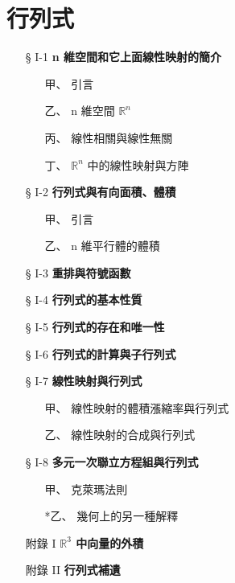 \section{行列式}\label{sec:b6-ch1}

\begin{center}
\begin{minipage}{0.75\textwidth}
\begin{itemize}[leftmargin=2em, itemsep=0.3em]
  \item[§ I-1] \textbf{n 維空間和它上面線性映射的簡介}
  \begin{itemize}[leftmargin=2em, itemsep=0.2em]
    \item[甲、] 引言
    \item[乙、] n 維空間 $\mathbb{R}^n$
    \item[丙、] 線性相關與線性無關
    \item[丁、] $\mathbb{R}^n$ 中的線性映射與方陣
  \end{itemize}
  \item[§ I-2] \textbf{行列式與有向面積、體積}
  \begin{itemize}[leftmargin=2em, itemsep=0.2em]
    \item[甲、] 引言
    \item[乙、] n 維平行體的體積
  \end{itemize}
  \item[§ I-3] \textbf{重排與符號函數}
  \item[§ I-4] \textbf{行列式的基本性質}
  \item[§ I-5] \textbf{行列式的存在和唯一性}
  \item[§ I-6] \textbf{行列式的計算與子行列式}
  \item[§ I-7] \textbf{線性映射與行列式}
  \begin{itemize}[leftmargin=2em, itemsep=0.2em]
    \item[甲、] 線性映射的體積漲縮率與行列式
    \item[乙、] 線性映射的合成與行列式
  \end{itemize}
  \item[§ I-8] \textbf{多元一次聯立方程組與行列式}
  \begin{itemize}[leftmargin=2em, itemsep=0.2em]
    \item[甲、] 克萊瑪法則
    \item[*乙、] 幾何上的另一種解釋
  \end{itemize}
  \item[附錄 I] \textbf{$\mathbb{R}^3$ 中向量的外積}
  \item[附錄 II] \textbf{行列式補遺}
\end{itemize}
\end{minipage}
\end{center}


